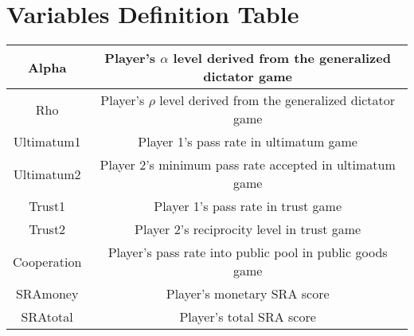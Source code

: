 \section{Variables Definition Table}
\vspace{8mm} 
\begin{center}
\begin{tabular}{ |c|c| } 
 \hline
 Alpha & Player\rq s \(\alpha\) level derived from the generalized dictator game \\ 
 \hline
  Rho & Player\rq s \(\rho\) level derived from the generalized dictator game \\ 
 \hline
 Ultimatum1 & Player 1\rq s pass rate in ultimatum game \\ 
 \hline
 Ultimatum2 & Player 2\rq s minimum pass rate accepted in ultimatum game  \\ 
 \hline
 Trust1 & Player 1\rq s pass rate in trust game \\ 
 \hline
 Trust2 & Player 2\rq s reciprocity level in trust game \\ 
 \hline
 Cooperation & Player\rq s pass rate into public pool in public goods game  \\ 
 \hline
 SRAmoney & Player\rq s monetary SRA score \\ 
 \hline
 SRAtotal & Player\rq s total SRA score \\ 
\hline
\end{tabular}
\end{center}